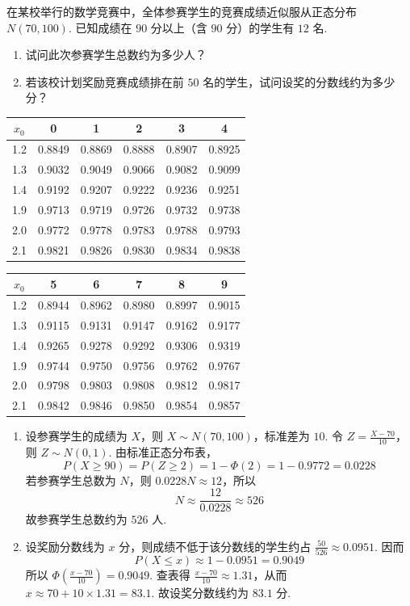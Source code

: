 \begin{problem}
在某校举行的数学竞赛中，全体参赛学生的竞赛成绩近似服从正态分布 \(N(70,100)\). 已知成绩在 \(90\) 分以上（含 \(90\) 分）的学生有 \(12\) 名.

\begin{enumerate}
\item 试问此次参赛学生总数约为多少人？
\item 若该校计划奖励竞赛成绩排在前 \(50\) 名的学生，试问设奖的分数线约为多少分？
\end{enumerate}

\begin{center}
\small
\begin{tabular}{c|ccccc}
\(x_0\) & 0 & 1 & 2 & 3 & 4 \\
\hline
1.2 & 0.8849 & 0.8869 & 0.8888 & 0.8907 & 0.8925 \\
1.3 & 0.9032 & 0.9049 & 0.9066 & 0.9082 & 0.9099 \\
1.4 & 0.9192 & 0.9207 & 0.9222 & 0.9236 & 0.9251 \\
1.9 & 0.9713 & 0.9719 & 0.9726 & 0.9732 & 0.9738 \\
2.0 & 0.9772 & 0.9778 & 0.9783 & 0.9788 & 0.9793 \\
2.1 & 0.9821 & 0.9826 & 0.9830 & 0.9834 & 0.9838
\end{tabular}

\vspace{0.4em}

\begin{tabular}{c|ccccc}
\(x_0\) & 5 & 6 & 7 & 8 & 9 \\
\hline
1.2 & 0.8944 & 0.8962 & 0.8980 & 0.8997 & 0.9015 \\
1.3 & 0.9115 & 0.9131 & 0.9147 & 0.9162 & 0.9177 \\
1.4 & 0.9265 & 0.9278 & 0.9292 & 0.9306 & 0.9319 \\
1.9 & 0.9744 & 0.9750 & 0.9756 & 0.9762 & 0.9767 \\
2.0 & 0.9798 & 0.9803 & 0.9808 & 0.9812 & 0.9817 \\
2.1 & 0.9842 & 0.9846 & 0.9850 & 0.9854 & 0.9857
\end{tabular}
\end{center}
\end{problem}

\begin{solution}
\begin{enumerate}
\item
设参赛学生的成绩为 \(X\)，则 \(X\sim N(70,100)\)，标准差为 \(10\). 令 \(Z=\frac{X-70}{10}\)，则 \(Z\sim N(0,1)\). 由标准正态分布表，
\[
P(X\geqslant90)=P(Z\geqslant2)=1-\Phi(2)=1-0.9772=0.0228
\]
若参赛学生总数为 \(N\)，则 \(0.0228N\approx12\)，所以
\[
N\approx\frac{12}{0.0228}\approx526
\]
故参赛学生总数约为 \(526\) 人.

\item
设奖励分数线为 \(x\) 分，则成绩不低于该分数线的学生约占 \(\frac{50}{526}\approx0.0951\). 因而
\[
P(X\leqslant x)\approx1-0.0951=0.9049
\]
所以 \(\Phi\left(\frac{x-70}{10}\right)=0.9049\). 查表得 \(\frac{x-70}{10}\approx1.31\)，从而 \(x\approx70+10\times1.31=83.1\). 故设奖分数线约为 \(83.1\) 分.
\end{enumerate}
\end{solution}

